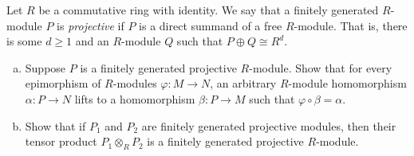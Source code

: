 \documentclass[10pt]{mypackage}
\begin{document}
\begin{problem}[Problem 4]
  Let $R$ be a commutative ring with identity. We say that a finitely generated $R$-module $P$ is \textit{projective} if $P$ is a direct summand of a free $R$-module. That is, there is some $d\geq 1$ and an $R$-module $Q$ such that $P\oplus Q\cong R^{d}$.
  \begin{enumerate}[(a)]
    \item Suppose $P$ is a finitely generated projective $R$-module. Show that for every epimorphism of $R$-modules $\varphi\colon M\rightarrow N$, an arbitrary $R$-module homomorphism $\alpha\colon P\rightarrow N$ lifts to a homomorphism $\beta\colon P\rightarrow M$ such that $\varphi\circ \beta = \alpha$.
    \item Show that if $P_1$ and $P_2$ are finitely generated projective modules, then their tensor product $P_1\otimes_{R} P_2$ is a finitely generated projective $R$-module.
  \end{enumerate}
\end{problem}
\end{document}
